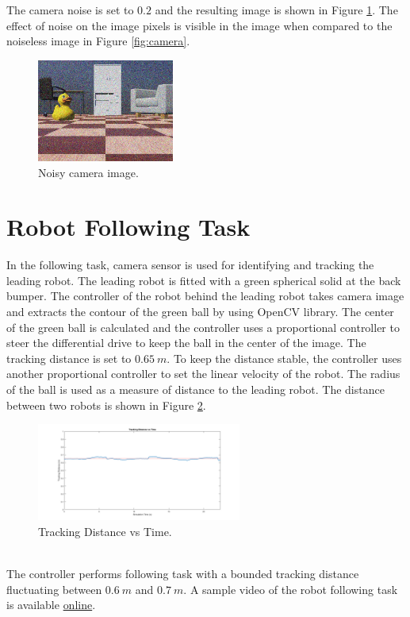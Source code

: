 \documentclass[11pt]{article}
\begin{document}
    \noindent The camera noise is set to $0.2$ and the resulting image is shown in Figure \ref{fig:camera-noise}. The effect of noise on the image pixels is visible in the image when compared to the noiseless image in Figure \ref{fig:camera}.
    \begin{figure}[ht!]
        \centering
        \includegraphics[width = 0.4\textwidth]{noisy_camera.jpg}
        \caption{Noisy camera image.}
        \label{fig:camera-noise}
    \end{figure}

    \section{Robot Following Task}
    In the following task, camera sensor is used for identifying and tracking the leading robot. The leading robot is fitted with a green spherical solid at the back bumper. 
    The controller of the robot behind the leading robot takes camera image and extracts the contour of the green ball by using OpenCV library. The center of the green ball is calculated and 
    the controller uses a proportional controller to steer the differential drive to keep the ball in the center of the image. The tracking distance is set to $0.65 \ m$. To keep the distance stable,
    the controller uses another proportional controller to set the linear velocity of the robot. The radius of the ball is used as a measure of distance to the leading robot. The distance between two robots is shown in Figure \ref{fig:distance}.
    \begin{figure}[ht]
        \centering
        \includegraphics[width = 0.6\textwidth]{track_distance.png}
        \caption{Tracking Distance vs Time.}
        \label{fig:distance}
    \end{figure}
    \\
    \noindent The controller performs following task with a bounded tracking distance fluctuating between $0.6 \ m$ and $0.7 \ m$. A sample video of the robot following task is available \href{https://www.youtube.com/watch?v=KW6KgzZL-Is}{online}.

    
\end{document}
